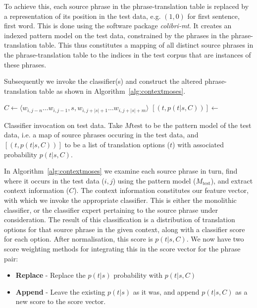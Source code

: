 \documentclass[smallextended]{svjour3}       %
\theoremstyle{break}
\begin{document}
To achieve this, each source phrase in the phrase-translation table is
replaced by a representation of its position in the test data, e.g.
$(1,0)$ for first sentence, first word.  This is done using the
software package \emph{colibri-mt}. It creates an indexed pattern
model on the test data, constrained by the phrases in the
phrase-translation table. This thus constitutes a mapping of all
distinct source phrases in the phrase-translation table to the indices
in the test corpus that are instances of these phrases.

Subsequently we invoke the classifier(s) and construct the altered
phrase-translation table as shown in Algorithm~\ref{alg:contextmoses}.

\begin{algorithm}
\begin{algorithmic}
    \State $C \gets \langle w_{i,j-n} \ldots w_{i,j-1}, s, w_{i,j+|s|+1} \ldots w_{i,j+|s|+m} \rangle$
    \State $[(t, p(t|s,C) )] \gets$ 
  \EndFor
\EndFor
\end{algorithmic}
\caption{Classifier invocation on test data. Take $M{\text{test}}$ to be the pattern
model of the test data, i.e. a map of source phrases occuring in the test
data, and $[(t,p(t|s,C))]$ to be a list of translation options ($t$) with
associated probability $p(t|s,C)$.}
\label{alg:contextmoses}
\end{algorithm}

In Algorithm~\ref{alg:contextmoses} we examine each source phrase in turn, find
where it occurs in the test data ($i,j$) using the pattern model
($M_{\text{test}}$), and extract context information ($C$). The context
information constitutes our feature vector, with which we invoke the
appropriate classifier. This is either the monolithic classifier, or the
classifier expert pertaining to the source phrase under consideration. The
result of this classification is a distribution of translation options for that
source phrase in the given context, along with a classifier score for each
option. After normalisation, this score is $p(t|s,C)$. We now have two score
weighting methods for integrating this in the score vector for the phrase pair:

\begin{itemize}
  \item \textbf{Replace} - Replace the $p(t|s)$ probability with $p(t|s,C)$
  \item \textbf{Append} - Leave the existing $p(t|s)$ as it was, and append
    $p(t|s,C)$ as a new score to the score vector.
\end{itemize}
\end{document}
